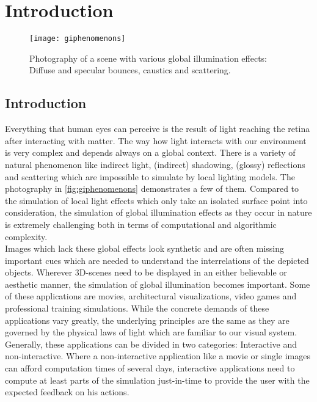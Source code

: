 \documentclass[thesis.tex]{subfiles}
\begin{document}
\chapter{Introduction}
\label{chap:introduction}

\begin{figure}[h]
\centering
\texttt{[image: giphenomenons]}
\caption{\cite{bib:RealtimeGIOverview} Photography of a scene with various global illumination effects: Diffuse and specular bounces, caustics and scattering.}
\label{fig:giphenomenons}
\end{figure}

\section{Introduction}
Everything that human eyes can perceive is the result of light reaching the retina after interacting with matter.
The way how light interacts with our environment is very complex and depends always on a global context.
There is a variety of natural phenomenon like indirect light, (indirect) shadowing, (glossy) reflections and scattering which are impossible to simulate by local lighting models.
The photography in \autoref{fig:giphenomenons} demonstrates a few of them.
Compared to the simulation of local light effects which only take an isolated surface point into consideration, the simulation of global illumination effects as they occur in nature is extremely challenging both in terms of computational and algorithmic complexity.
\\
Images which lack these global effects look synthetic and are often missing important cues which are needed to understand the interrelations of the depicted objects.
Wherever 3D-scenes need to be displayed in an either believable or aesthetic manner, the simulation of global illumination becomes important.
Some of these applications are movies, architectural visualizations, video games and professional training simulations.
While the concrete demands of these applications vary greatly, the underlying principles are the same as they are governed by the physical laws of light which are familiar to our visual system.
\\
Generally, these applications can be divided in two categories: Interactive and non-interactive.
Where a non-interactive application like a movie or single images can afford computation times of several days, interactive applications need to compute at least parts of the simulation just-in-time to provide the user with the expected feedback on his actions.
\end{document}
